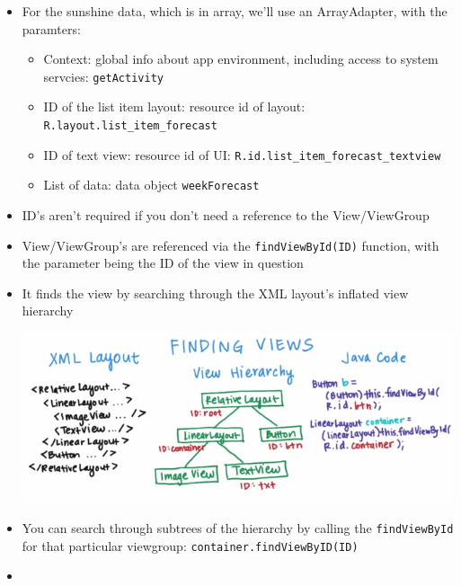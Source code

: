 \begin{itemize}[--]
	\item For the sunshine data, which is in array, we'll use an ArrayAdapter, with the paramters:
	\begin{itemize}[--]
		\item Context: global info about app environment, including access to system servcies: \texttt{getActivity\(\)}
		\item ID of the list item layout: resource id of layout: \texttt{R.layout.list\_item\_forecast}
		\item ID of text view: resource id of UI: \texttt{R.id.list\_item\_forecast\_textview}
		\item List of data: data object \texttt{weekForecast}
	\end{itemize}

	\item ID's aren't required if you don't need a reference to the View/ViewGroup
	\item View/ViewGroup's are referenced via the \texttt{findViewById(ID)} function, with the parameter being the ID of the view in question
	\item It finds the view by searching through the XML layout's inflated view hierarchy
	\begin{center}
		\includegraphics[scale=0.6]{sections/1/views.png}
	\end{center}

	\item You can search through subtrees of the hierarchy by calling the \texttt{findViewById} for that particular viewgroup: \texttt{container.findViewByID(ID)}
	\item 
\end{itemize}
